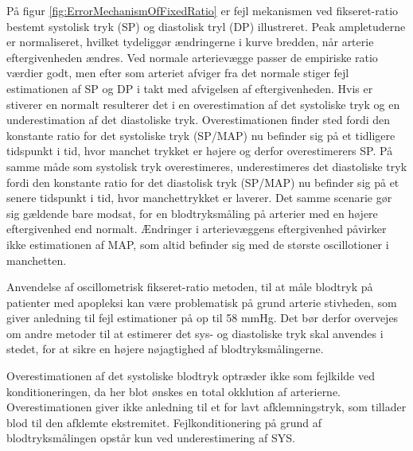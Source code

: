 \begin{minipage}[t]{0.5\textwidth}
På figur \ref{fig:ErrorMechanismOfFixedRatio} er fejl mekanismen ved fikseret-ratio bestemt systolisk tryk (SP) og diastolisk tryl (DP) illustreret. Peak ampletuderne er normaliseret, hvilket tydeliggør ændringerne i kurve bredden, når arterie eftergivenheden ændres. Ved normale arterievægge passer de empiriske ratio værdier godt, men efter som arteriet afviger fra det normale stiger fejl estimationen af SP og DP i takt med afvigelsen af eftergivenheden. Hvis er stiverer en normalt resulterer det i en overestimation af det systoliske tryk og en underestimation af det diastoliske tryk. Overestimationen finder sted fordi den konstante ratio for det systoliske tryk (SP/MAP) nu befinder sig på et tidligere tidspunkt i tid, hvor manchet trykket er højere og derfor overestimerers SP. På samme måde som systolisk tryk overestimeres, underestimeres det diastoliske tryk fordi den konstante ratio for det diastolisk tryk (SP/MAP) nu befinder sig på et senere tidspunkt i tid, hvor manchettrykket er laverer. Det samme scenarie gør sig gældende bare modsat, for en blodtryksmåling på arterier med en højere eftergivenhed end normalt. Ændringer i arterievæggens eftergivenhed påvirker ikke estimationen af MAP, som altid befinder sig med de største oscillotioner i manchetten.

Anvendelse af oscillometrisk fikseret-ratio metoden, til at måle blodtryk på patienter med apopleksi kan være problematisk på grund arterie stivheden, som giver anledning til fejl estimationer på op til 58 mmHg. Det bør derfor overvejes om andre metoder til at estimerer det sys- og diastoliske tryk skal anvendes i stedet, for at sikre en højere nøjagtighed af blodtryksmålingerne.

Overestimationen af det systoliske blodtryk optræder ikke som fejlkilde ved konditioneringen, da her blot ønskes en total okklution af arterierne. Overestimationen giver ikke anledning til et for lavt afklemningstryk, som tillader blod til den afklemte ekstremitet. Fejlkonditionering på grund af blodtryksmålingen opstår kun ved underestimering af SYS.
\end{minipage}
